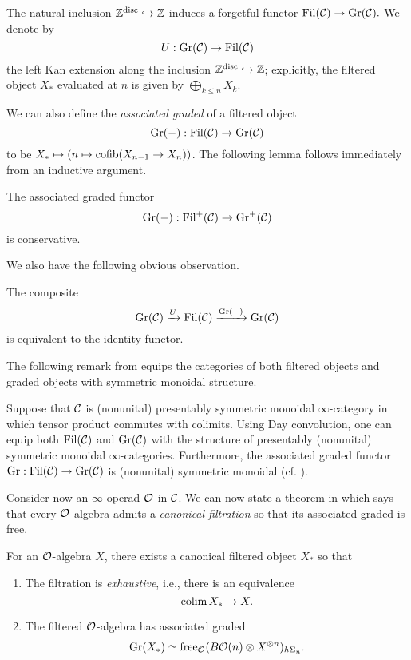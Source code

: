 The natural inclusion $ {\mathbb{Z}}^{\operatorname{disc}}\hookrightarrow {\mathbb{Z}}$ induces a forgetful functor
$
\operatorname{\operatorname{Fil}}({\mathcal{C}}) \to \operatorname{Gr}({\mathcal{C}}). 
$
We denote by
$$
U: \operatorname{\operatorname{Gr}}({\mathcal{C}}) \to \operatorname{\operatorname{Fil}}({\mathcal{C}})
$$ the left Kan extension along the inclusion $ {\mathbb{Z}}^{\operatorname{disc}}\hookrightarrow {\mathbb{Z}}$; explicitly, the filtered object $X_*$ evaluated at $n$ is given by $\bigoplus_{k\leq n} X_k$.

We can also define the \emph{associated graded} of a filtered object 
$$
\operatorname{\operatorname{Gr}}(-):
\operatorname{\operatorname{Fil}}({\mathcal{C}})
\to 
\operatorname{\operatorname{Gr}}({\mathcal{C}})
$$
to be $X_* \mapsto (n \mapsto \operatorname{cofib}(X_{n-1} \to X_{n}))$.
The following lemma follows immediately from an inductive argument.
\begin{lemma}
\label{Ass-gr is conservative}
	The associated graded functor $$\operatorname{\operatorname{Gr}}(-):
\operatorname{\operatorname{Fil}}^{+}({\mathcal{C}})
\to 
\operatorname{Gr}^{+}({\mathcal{C}})
$$
is conservative.
\end{lemma}

We also have the following obvious observation.
\begin{lemma}
	The composite 
	\[
	\operatorname{\operatorname{Gr}}({\mathcal{C}}) \xrightarrow{U} 
	\operatorname{\operatorname{Fil}}({\mathcal{C}})
	\xrightarrow{\operatorname{\operatorname{Gr}}(-)} 
	\operatorname{\operatorname{Gr}}({\mathcal{C}}) 
	\]
	is equivalent to the identity functor.
\end{lemma}

The following remark from \cite{Brantner-Mathew} equips the categories of both filtered objects and graded objects with symmetric monoidal structure.
\begin{remark}
\cite[Definition 2.5]{Brantner-Mathew}
\label{BM def 2.5}
Suppose that ${\mathcal{C}}$ is (nonunital) presentably symmetric monoidal $\infty$-category in which tensor product commutes with colimits.
Using Day convolution, one can equip both $\operatorname{\operatorname{Fil}}({\mathcal{C}})$ and $\operatorname{\operatorname{Gr}}({\mathcal{C}})$ with the structure of presentably (nonunital) symmetric monoidal $\infty$-categories. Furthermore, the associated graded functor $\operatorname{\operatorname{Gr}} : \operatorname{\operatorname{Fil}}({\mathcal{C}}) \to \operatorname{\operatorname{Gr}}({\mathcal{C}})$ is (nonunital) symmetric monoidal (cf. \cite[Sec. 2.23]{Glasman}).
\end{remark}

Consider now an $\infty$-operad ${\mathcal{O}}$ in ${\mathcal{C}}$. We can now state a theorem in \cite{Heuts_Koszul} which says that every ${\mathcal{O}}$-algebra admits a \emph{canonical filtration} so that its associated graded is free.
\begin{theorem}
\label{Canonical grading on an O-algebra}
\cite[Theorem 5.2 (2)]{Heuts_Koszul}
For an ${\mathcal{O}}$-algebra $X$, there exists a canonical filtered object $X_{*}$ so that 
\begin{enumerate}
    \item The filtration is \emph{exhaustive}, i.e., there is an equivalence
    $$
    \operatorname{colim} X_{*} \to X.
    $$
    \item The filtered ${\mathcal{O}}$-algebra has associated graded
    $$
    \operatorname{\operatorname{Gr}}(X_*)\simeq \operatorname{free}_{{\mathcal{O}}}(B{\mathcal{O}}(n)\otimes X^{\otimes n })_{h\Sigma_n}.
    $$
\end{enumerate}


\end{theorem}



